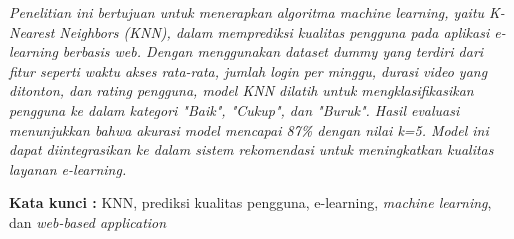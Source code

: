 \begin{abstractind}

\textit{Penelitian ini bertujuan untuk menerapkan algoritma machine learning, yaitu K-Nearest Neighbors (KNN), dalam memprediksi kualitas pengguna pada aplikasi e-learning berbasis web. Dengan menggunakan dataset dummy yang terdiri dari fitur seperti waktu akses rata-rata, jumlah login per minggu, durasi video yang ditonton, dan rating pengguna, model KNN dilatih untuk mengklasifikasikan pengguna ke dalam kategori "Baik", "Cukup", dan "Buruk". Hasil evaluasi menunjukkan bahwa akurasi model mencapai 87\% dengan nilai k=5. Model ini dapat diintegrasikan ke dalam sistem rekomendasi untuk meningkatkan kualitas layanan e-learning.}

\bigskip
\noindent
\textbf{Kata kunci :} KNN, prediksi kualitas pengguna, e-learning, \textit{machine learning}, dan \textit{web-based application}
\end{abstractind}
